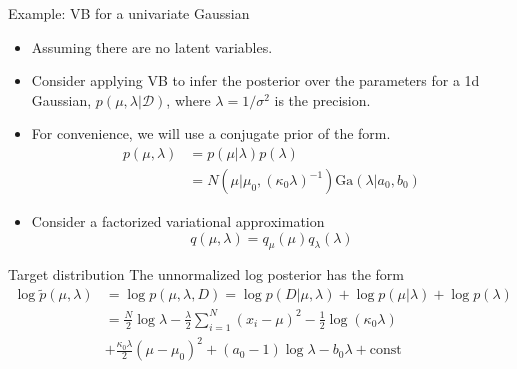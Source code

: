 \documentclass[10pt,mathserif]{beamer}
\begin{document}
\begin{frame}{Example: VB for a univariate Gaussian}
\begin{itemize}
    \item Assuming there are no latent variables.
    \item Consider applying VB to infer the posterior over the parameters for a 1d Gaussian, $p(\mu, \lambda|\mathcal{D})$, where $\lambda = 1/\sigma^2$ is the precision.
    \item For convenience, we will use a conjugate prior of the form. 
    \begin{equation}
        \begin{split}
            p(\mu, \lambda) & = p(\mu|\lambda)p(\lambda)\\
                            & = N (\mu|\mu_0,(\kappa_0\lambda) ^{-1})\mbox{Ga}(\lambda|a_0, b_0)  
        \end{split}
    \end{equation}
    \item Consider a factorized variational approximation
    \begin{equation}
        q(\mu, \lambda) = q_\mu(\mu)q_\lambda(\lambda)
    \end{equation}
\end{itemize}
\end{frame}


\begin{frame}{Target distribution}
The unnormalized log posterior has the form
\begin{equation}
    \begin{split}
        \log\widetilde{p}(\mu, \lambda) 
        & = \log p(\mu, \lambda, D) = \log p(D|\mu, \lambda) + \log p(\mu|\lambda) + \log p(\lambda) \\
        & = \frac{N}{2} \log \lambda - \frac{\lambda}{2}\sum_{i=1}^N (x_i - \mu)^2 - \frac{1}{2}\log(\kappa_0\lambda)\\
        & + \frac{\kappa_0\lambda}{2}  (\mu - \mu_0)^2 + (a_0 - 1)\log\lambda - b_0\lambda + \mbox{const}
    \end{split}
\end{equation}
\end{frame}
\end{document}
